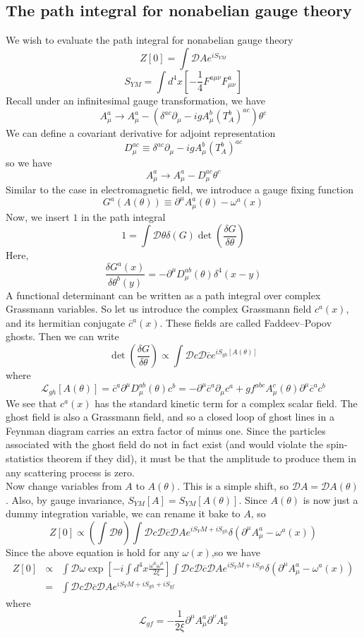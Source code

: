 \subsection{The path integral for nonabelian gauge theory}
We wish to evaluate the path integral for nonabelian gauge theory
\[Z[0] = \int \mathcal{D}A e^{iS_{YM}}\]
\[S_{YM} = \int d^4x \left[-\frac{1}{4}F^{a\mu\nu}F^{a}_{\mu\nu} \right]\]
Recall under an infinitesimal gauge transformation, we have
\[A^{a}_{\mu} \to A^{a}_{\mu} -(\delta^{ac}\partial_{\mu}-igA^{b}_{\mu}(T_{A}^{b})^{ac})\theta^c\]
We can define a covariant derivative for adjoint representation
\[D_{\mu}^{ac} \equiv \delta^{ac}\partial_{\mu}-igA^{b}_{\mu}(T_{A}^{b})^{ac}\]
so we have
\[A^{a}_{\mu} \to A^{a}_{\mu} - D_{\mu}^{ac}\theta^c\]
Similar to the case in electromagnetic field, we introduce a gauge fixing function
\[G^a(A(\theta)) \equiv \partial^{\mu}A^a_{\mu}(\theta)  - \omega^a(x)\]
Now, we insert $1$ in the path integral
\[1 = \int \mathcal{D}\theta \delta(G) \det\left( \frac{\delta G}{\delta \theta} \right)\]
Here,
\[\frac{\delta G^a(x)}{\delta \theta^b(y)} = -\partial^{\mu}D_{\mu}^{ab}(\theta)\delta^4(x-y)\]
A functional determinant can be written as a path integral over complex Grassmann variables. So let us introduce the complex Grassmann field $c^a(x)$, and its hermitian conjugate $\overline{c}^a(x)$. These fields are called Faddeev–Popov ghosts. Then we can write
\[ \det\left( \frac{\delta G}{\delta \theta} \right) \propto \int \mathcal{D}c \mathcal{D}\overline{c} e^{iS_{gh}[A(\theta)]}\]
where
\[\mathcal{L}_{gh}[A(\theta)] = \overline{c}^a \partial^{\mu}D^{ab}_{\mu}(\theta)c^b = -\partial^{\mu}\overline{c}^a \partial_{\mu}c^a + gf^{abc}A^c_{\mu}(\theta)\partial^{\mu}\overline{c}^a c^b\]
We see that $c^a(x)$ has the standard kinetic term for a complex scalar field.  The ghost field is also a Grassmann field, and so a closed loop of ghost lines in a Feynman diagram carries an extra factor of minus one. Since the particles associated with the ghost field do not in fact exist (and would violate the spin-statistics theorem if they did), it must be that the amplitude to produce them in any scattering process is zero.
\\
Now change variables from $A$ to $A(\theta)$. This is a simple shift, so $\mathcal{D}A = \mathcal{D}A(\theta)$. Also, by gauge invariance, $S_{YM}[A] = S_{YM}[A(\theta)]$. Since $A(\theta)$ is now just a dummy integration variable, we can rename it bake to $A$, so
\[Z[0] \propto \left(\int \mathcal{D}\theta\right) \int \mathcal{D}c \mathcal{D}\overline{c} \mathcal{D}A e^{iS_YM + iS_{gh}} \delta(\partial^{\mu}A^a_{\mu}-\omega^a(x))\]
Since the above equation is hold for any $\omega(x)$,so we have
\begin{eqnarray}
Z[0] &\propto& \int \mathcal{D}\omega \exp \left[-i\int d^4x \frac{\omega^a\omega^a}{2\xi} \right] \int \mathcal{D}c \mathcal{D}\overline{c} \mathcal{D}A e^{iS_YM + iS_{gh}} \delta(\partial^{\mu}A^a_{\mu}-\omega^a(x)) \nonumber \\
&=&  \int \mathcal{D}c \mathcal{D}\overline{c} \mathcal{D}A e^{iS_YM + iS_{gh} + iS_{gf}}
\end{eqnarray}
where
\[\mathcal{L}_{gf} = -\frac{1}{2\xi}\partial^{\mu}A^a_{\mu} \partial^{\nu}A^a_{\nu}\]


